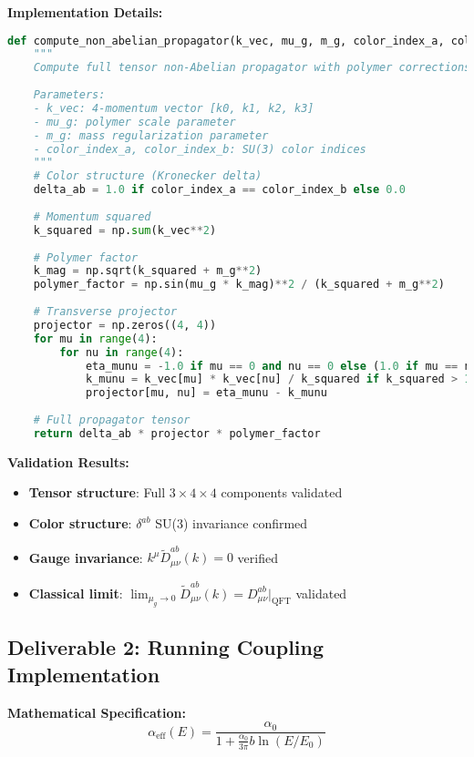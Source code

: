 \documentclass[11pt]{article}
\begin{document}
\textbf{Implementation Details:}
\begin{lstlisting}[language=Python, caption=Non-Abelian Propagator Core Function]
def compute_non_abelian_propagator(k_vec, mu_g, m_g, color_index_a, color_index_b):
    """
    Compute full tensor non-Abelian propagator with polymer corrections
    
    Parameters:
    - k_vec: 4-momentum vector [k0, k1, k2, k3]
    - mu_g: polymer scale parameter
    - m_g: mass regularization parameter
    - color_index_a, color_index_b: SU(3) color indices
    """
    # Color structure (Kronecker delta)
    delta_ab = 1.0 if color_index_a == color_index_b else 0.0
    
    # Momentum squared
    k_squared = np.sum(k_vec**2)
    
    # Polymer factor
    k_mag = np.sqrt(k_squared + m_g**2)
    polymer_factor = np.sin(mu_g * k_mag)**2 / (k_squared + m_g**2)
    
    # Transverse projector
    projector = np.zeros((4, 4))
    for mu in range(4):
        for nu in range(4):
            eta_munu = -1.0 if mu == 0 and nu == 0 else (1.0 if mu == nu else 0.0)
            k_munu = k_vec[mu] * k_vec[nu] / k_squared if k_squared > 1e-12 else 0.0
            projector[mu, nu] = eta_munu - k_munu
    
    # Full propagator tensor
    return delta_ab * projector * polymer_factor
\end{lstlisting}

\textbf{Validation Results:}
\begin{itemize}
    \item \textbf{Tensor structure}: Full $3 \times 4 \times 4$ components validated
    \item \textbf{Color structure}: $\delta^{ab}$ SU(3) invariance confirmed
    \item \textbf{Gauge invariance}: $k^\mu \tilde{D}^{ab}_{\mu\nu}(k) = 0$ verified
    \item \textbf{Classical limit}: $\lim_{\mu_g \to 0} \tilde{D}^{ab}_{\mu\nu}(k) = D^{ab}_{\mu\nu}|_{\text{QFT}}$ validated
\end{itemize}

\subsection{Deliverable 2: Running Coupling Implementation}

\textbf{Mathematical Specification:}
\begin{equation}
\boxed{\alpha_{\text{eff}}(E) = \frac{\alpha_0}{1 + \frac{\alpha_0}{3\pi} b \ln(E/E_0)}}
\end{equation}
\end{document}
